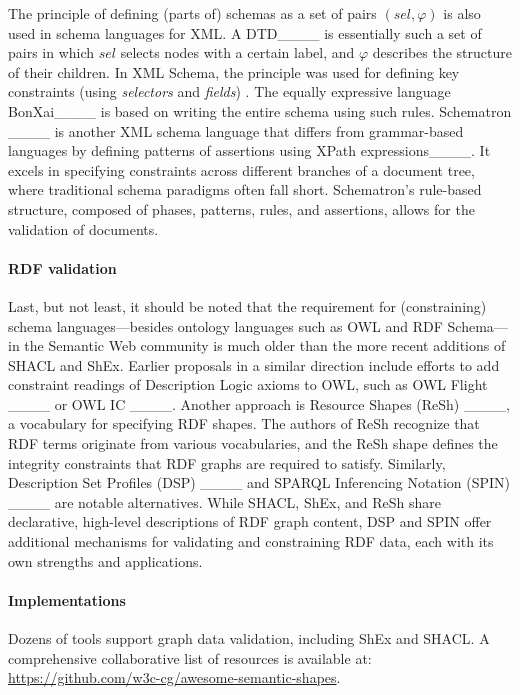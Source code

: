 The principle of defining (parts of) schemas as a set of pairs $(sel,\varphi)$ is also used in schema languages for XML. A DTD____ is essentially such a set of pairs in which $sel$ selects nodes with a certain label, and $\varphi$ describes the structure of their children. In XML Schema, the principle was used for defining key constraints (using \emph{selectors} and \emph{fields}) \cite[Section~3.11.1]{xsd}. The equally expressive language BonXai____ is based on writing the entire schema using such rules. Schematron ____ is another XML schema language that differs from grammar-based languages by defining patterns of assertions using XPath expressions____. It excels in specifying constraints across different branches of a document tree, where traditional schema paradigms often fall short. Schematron's rule-based structure, composed of phases, patterns, rules, and assertions, allows for the validation of documents.

\paragraph{RDF validation}

Last, but not least, it should be noted that the requirement for (constraining) schema languages—besides ontology languages such as OWL and RDF Schema—in the Semantic Web community is much older than the more recent additions of SHACL and ShEx. Earlier proposals in a similar direction include efforts to add constraint readings of Description Logic axioms to OWL, such as OWL Flight ____ or OWL IC ____. Another approach is Resource Shapes (ReSh) ____, a vocabulary for specifying RDF shapes. The authors of ReSh recognize that RDF terms originate from various vocabularies, and the ReSh shape defines the integrity constraints that RDF graphs are required to satisfy. Similarly, Description Set Profiles (DSP) ____ and SPARQL Inferencing Notation (SPIN) ____ are notable alternatives. While SHACL, ShEx, and ReSh share declarative, high-level descriptions of RDF graph content, DSP and SPIN offer additional mechanisms for validating and constraining RDF data, each with its own strengths and applications.

\paragraph{Implementations}
Dozens of tools support graph data validation, including ShEx and SHACL. A comprehensive collaborative list of resources is available at:
\url{https://github.com/w3c-cg/awesome-semantic-shapes}.
